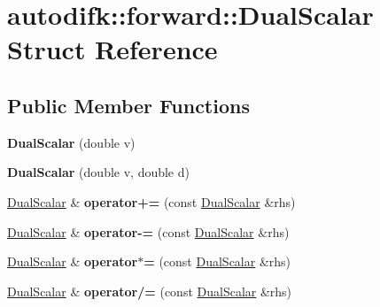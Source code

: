 \hypertarget{structautodifk_1_1forward_1_1_dual_scalar}{\section{autodifk\-:\-:forward\-:\-:Dual\-Scalar Struct Reference}
\label{structautodifk_1_1forward_1_1_dual_scalar}
}
\subsection*{Public Member Functions}
\begin{DoxyCompactItemize}
\item 
\hypertarget{structautodifk_1_1forward_1_1_dual_scalar_a644f21b9238e1492c87dbf2410aaa429}{{\bfseries Dual\-Scalar} (double v)}\label{structautodifk_1_1forward_1_1_dual_scalar_a644f21b9238e1492c87dbf2410aaa429}

\item 
\hypertarget{structautodifk_1_1forward_1_1_dual_scalar_aa18242f5946144ace77cbd911d0d3f9f}{{\bfseries Dual\-Scalar} (double v, double d)}\label{structautodifk_1_1forward_1_1_dual_scalar_aa18242f5946144ace77cbd911d0d3f9f}

\item 
\hypertarget{structautodifk_1_1forward_1_1_dual_scalar_ad81932a8fda687d7dc87741363f0ecba}{\hyperlink{structautodifk_1_1forward_1_1_dual_scalar}{Dual\-Scalar} \& {\bfseries operator+=} (const \hyperlink{structautodifk_1_1forward_1_1_dual_scalar}{Dual\-Scalar} \&rhs)}\label{structautodifk_1_1forward_1_1_dual_scalar_ad81932a8fda687d7dc87741363f0ecba}

\item 
\hypertarget{structautodifk_1_1forward_1_1_dual_scalar_a44f50035ebb486e8610d5da01b5900e6}{\hyperlink{structautodifk_1_1forward_1_1_dual_scalar}{Dual\-Scalar} \& {\bfseries operator-\/=} (const \hyperlink{structautodifk_1_1forward_1_1_dual_scalar}{Dual\-Scalar} \&rhs)}\label{structautodifk_1_1forward_1_1_dual_scalar_a44f50035ebb486e8610d5da01b5900e6}

\item 
\hypertarget{structautodifk_1_1forward_1_1_dual_scalar_ab58fd4d4e986d0dc8d6a5a433fa9a48e}{\hyperlink{structautodifk_1_1forward_1_1_dual_scalar}{Dual\-Scalar} \& {\bfseries operator$\ast$=} (const \hyperlink{structautodifk_1_1forward_1_1_dual_scalar}{Dual\-Scalar} \&rhs)}\label{structautodifk_1_1forward_1_1_dual_scalar_ab58fd4d4e986d0dc8d6a5a433fa9a48e}

\item 
\hypertarget{structautodifk_1_1forward_1_1_dual_scalar_a4460eee6e05601ff7b254d98ece3f9c6}{\hyperlink{structautodifk_1_1forward_1_1_dual_scalar}{Dual\-Scalar} \& {\bfseries operator/=} (const \hyperlink{structautodifk_1_1forward_1_1_dual_scalar}{Dual\-Scalar} \&rhs)}\label{structautodifk_1_1forward_1_1_dual_scalar_a4460eee6e05601ff7b254d98ece3f9c6}

\end{DoxyCompactItemize}
